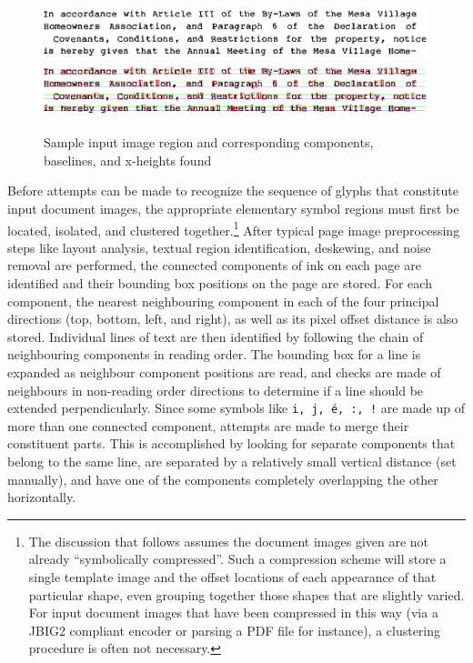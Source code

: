 \documentclass[times, 10pt,twocolumn]{article}
\begin{document}
\begin{figure}[ht]
  \centering
  \includegraphics[scale=1]{figures/input_lines}
  \includegraphics[scale=1]{figures/line_comps}
  \caption{Sample input image region and corresponding components, baselines,
           and x-heights found}
  \label{inimg_fig}
\end{figure}

\label{clustering_sec}

Before attempts can be made to recognize the sequence of glyphs that 
constitute input document images, the appropriate elementary symbol regions 
must first be located, isolated, and clustered together.\footnote{The
discussion that follows assumes the document images given are not
already ``symbolically compressed''. Such a compression scheme will
store a single template image and the offset locations of each
appearance of that particular shape, even grouping together
those shapes that are slightly varied.  For input document images that
have been compressed in this way (via a JBIG2 compliant encoder 
or parsing a PDF file for instance), a clustering procedure is often not necessary.}
After typical page image preprocessing steps like layout analysis, textual
region identification, deskewing, and noise removal are performed, the
connected components of ink on each page are identified and their bounding box
positions on the page are stored.  For each component, the nearest neighbouring
component in each of the four principal directions (top, bottom, left, and
right), as well as its pixel offset distance is also stored.  Individual lines
of text are then identified by following the chain of neighbouring components in
reading order.  The bounding box for a line is expanded as neighbour
component positions are read, and checks are made of neighbours in non-reading
order directions to determine if a line should be extended perpendicularly.
%
Since some symbols like {\tt i, j, \'{e}, :, !} are made up of more than one
connected component, attempts are made to merge their constituent parts.  This
is accomplished by looking for separate components that belong to the same
line, are separated by a relatively small vertical distance (set manually), and
have one of the components completely overlapping the other horizontally.
\end{document}
